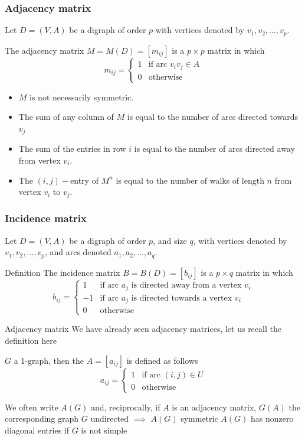 \documentclass[aspectratio=43]{beamer}
\begin{document}
\begin{frame}\frametitle{Adjacency matrix}
	Let $D=(V,A)$ be a digraph of order $p$ with vertices denoted by $v_1, v_2, \dots , v_p$.
	\begin{definition}
	The adjacency matrix $M=M(D)=[m_{ij}]$ is a $p\times p$ matrix in which
	$$m_{ij}=\left \{ 
	\begin{array}{cl}
	1 & \textrm{if arc } v_iv_j \in A\\
	0 & \textrm{otherwise}
	\end{array}
	\right .
	$$
	\end{definition}
	\begin{theorem}[{Properties}]
	\begin{itemize}
	\item $M$ is not necessarily symmetric.
	\item The sum of any column of $M$ is equal to the number of arcs directed towards $v_j$
	\item The sum of the entries in row $i$ is equal to the number of arcs directed away from vertex $v_i$.
	\item The $(i,j)-$entry of $M^n$ is equal to the number of walks of length $n$ from vertex $v_i$ to $v_j$.
	\end{itemize}
	\end{theorem}
\end{frame}
	
\begin{frame}\frametitle{Incidence matrix}
	Let $D=(V,A)$ be a digraph of order $p$, and size $q$, with vertices denoted by $v_1, v_2, \dots , v_p$, and arcs denoted $a_1, a_2, \dots , a_q$.
	\begin{definition}{Definition}
	The incidence matrix $B=B(D)=[b_{ij}]$ is a $p\times q$ matrix in which
	$$b_{ij}=\left \{ 
	\begin{array}{cl}
	1 & \textrm{if arc } a_j  \textrm{ is directed away from a vertex } v_i\\
	-1 & \textrm{if arc } a_j  \textrm{ is directed towards a vertex } v_i\\
	0 & \textrm{otherwise}
	\end{array}
	\right .
	$$
	\end{definition}
\end{frame}
	
	
	
	
\begin{frame}{Adjacency matrix}
	We have already seen adjacency matrices, let us recall the definition here
	\begin{definition}
		$G$ a 1-graph, then the  $A=[a_{ij}]$ is defined as follows
		\[
		a_{ij} = \begin{cases}
			1 & \text{if arc } (i,j)\in U\\
			0 & \text{otherwise}
		\end{cases}
		\]
	\end{definition}
	\vfill
	We often write $A(G)$ and, reciprocally, if $A$ is an adjacency matrix, $G(A)$ the corresponding graph
	\vfill
	$G$ undirected $\implies$ $A(G)$ symmetric
	\vfill
	$A(G)$ has nonzero diagonal entries if $G$ is not simple
\end{frame}
\end{document}
